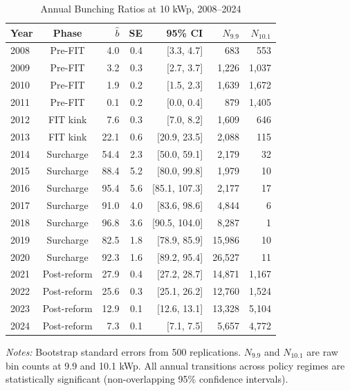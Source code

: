\begin{table}[t]
\centering
\caption{Annual Bunching Ratios at 10 kWp, 2008--2024}
\label{tab:annual}
\begin{tabular}{lcrrrrr}
\toprule
Year & Phase & $\hat{b}$ & SE & 95\% CI & $N_{9.9}$ & $N_{10.1}$ \\
\midrule
2008 & Pre-FIT & 4.0 & 0.4 & [3.3, 4.7] & 683 & 553 \\
2009 & Pre-FIT & 3.2 & 0.3 & [2.7, 3.7] & 1,226 & 1,037 \\
2010 & Pre-FIT & 1.9 & 0.2 & [1.5, 2.3] & 1,639 & 1,672 \\
2011 & Pre-FIT & 0.1 & 0.2 & [0.0, 0.4] & 879 & 1,405 \\
\midrule
2012 & FIT kink & 7.6 & 0.3 & [7.0, 8.2] & 1,609 & 646 \\
2013 & FIT kink & 22.1 & 0.6 & [20.9, 23.5] & 2,088 & 115 \\
\midrule
2014 & Surcharge & 54.4 & 2.3 & [50.0, 59.1] & 2,179 & 32 \\
2015 & Surcharge & 88.4 & 5.2 & [80.0, 99.8] & 1,979 & 10 \\
2016 & Surcharge & 95.4 & 5.6 & [85.1, 107.3] & 2,177 & 17 \\
2017 & Surcharge & 91.0 & 4.0 & [83.6, 98.6] & 4,844 & 6 \\
2018 & Surcharge & 96.8 & 3.6 & [90.5, 104.0] & 8,287 & 1 \\
2019 & Surcharge & 82.5 & 1.8 & [78.9, 85.9] & 15,986 & 10 \\
2020 & Surcharge & 92.3 & 1.6 & [89.2, 95.4] & 26,527 & 11 \\
\midrule
2021 & Post-reform & 27.9 & 0.4 & [27.2, 28.7] & 14,871 & 1,167 \\
2022 & Post-reform & 25.6 & 0.3 & [25.1, 26.2] & 12,760 & 1,524 \\
2023 & Post-reform & 12.9 & 0.1 & [12.6, 13.1] & 13,328 & 5,104 \\
2024 & Post-reform & 7.3 & 0.1 & [7.1, 7.5] & 5,657 & 4,772 \\
\bottomrule
\end{tabular}

\begin{flushleft}\small \textit{Notes:} Bootstrap standard errors from 500 replications. $N_{9.9}$ and $N_{10.1}$ are raw bin counts at 9.9 and 10.1 kWp. All annual transitions across policy regimes are statistically significant (non-overlapping 95\% confidence intervals).\end{flushleft}
\end{table}

